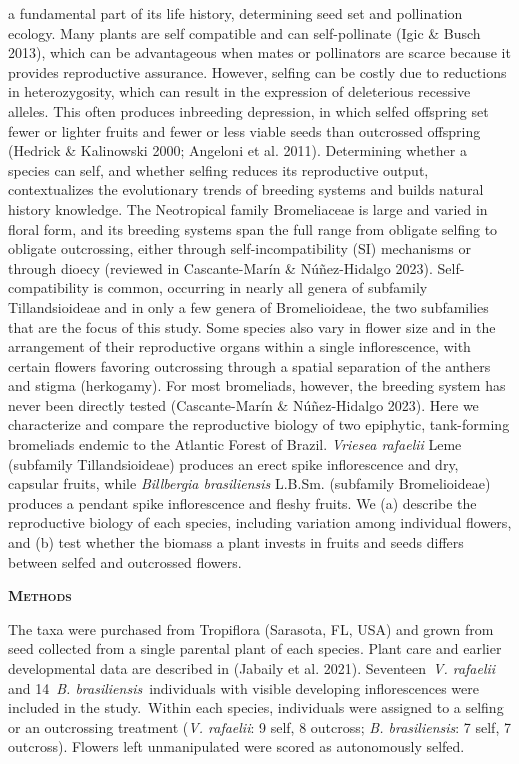 \documentclass[
]{article}
\begin{document}
a fundamental part of its life history, determining seed set and
pollination ecology. Many plants are self compatible and can
self-pollinate (Igic \& Busch 2013), which can be advantageous when
mates or pollinators are scarce because it provides reproductive
assurance. However, selfing can be costly due to reductions in
heterozygosity, which can result in the expression of deleterious
recessive alleles. This often produces inbreeding depression, in which
selfed offspring set fewer or lighter fruits and fewer or less viable
seeds than outcrossed offspring (Hedrick \& Kalinowski 2000; Angeloni et
al. 2011). Determining whether a species can self, and whether selfing
reduces its reproductive output, contextualizes the evolutionary trends
of breeding systems and builds natural history knowledge. The
Neotropical family Bromeliaceae is large and varied in floral form, and
its breeding systems span the full range from obligate selfing to
obligate outcrossing, either through self-incompatibility (SI)
mechanisms or through dioecy (reviewed in Cascante-Marín \&
Núñez-Hidalgo 2023). Self-compatibility is common, occurring in nearly
all genera of subfamily Tillandsioideae and in only a few genera of
Bromelioideae, the two subfamilies that are the focus of this study.
Some species also vary in flower size and in the arrangement of their
reproductive organs within a single inflorescence, with certain flowers
favoring outcrossing through a spatial separation of the anthers and
stigma (herkogamy). For most bromeliads, however, the breeding system
has never been directly tested (Cascante-Marín \& Núñez-Hidalgo 2023).
Here we characterize and compare the reproductive biology of two
epiphytic, tank-forming bromeliads endemic to the Atlantic Forest of
Brazil. \emph{Vriesea rafaelii} Leme (subfamily Tillandsioideae)
produces an erect spike inflorescence and dry, capsular fruits, while
\emph{Billbergia brasiliensis} L.B.Sm. (subfamily Bromelioideae)
produces a pendant spike inflorescence and fleshy fruits. We (a)
describe the reproductive biology of each species, including variation
among individual flowers, and (b) test whether the biomass a plant
invests in fruits and seeds differs between selfed and outcrossed
flowers.

\textbf{\textsc{Methods}}

The taxa were purchased from Tropiflora (Sarasota, FL, USA) and grown
from seed collected from a single parental plant of each species. Plant
care and earlier developmental data are described in (Jabaily et al.
2021). Seventeen~\emph{V. rafaelii} and 14~\emph{B.
brasiliensis}~individuals with visible developing inflorescences were
included in the study.~Within each species, individuals were assigned to
a selfing or an outcrossing treatment (\emph{V. rafaelii}: 9 self, 8
outcross; \emph{B. brasiliensis}: 7 self, 7 outcross). Flowers left
unmanipulated were scored as autonomously selfed.
\end{document}
